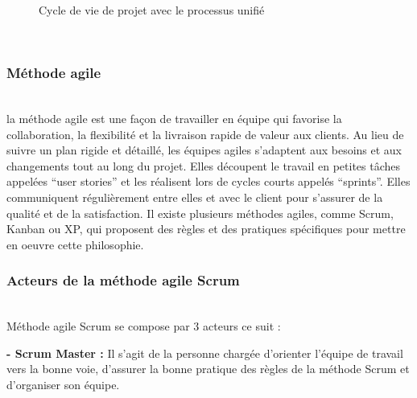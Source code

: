 \begin{figure}[H]
    \begin{center}
    \end{center}
    \caption{Cycle de vie de projet avec le processus unifié }
\end{figure}
\texttt{}\\[0.2cm]
\subsubsection{\Large Méthode agile }
\texttt{}\\[0.1cm]
\textsf{\selectfont{} la méthode agile est une façon de travailler en équipe qui favorise la collaboration, la flexibilité et la livraison rapide de valeur aux clients. Au lieu de suivre un plan rigide et détaillé, les équipes agiles s’adaptent aux besoins et aux changements tout au long du projet. Elles découpent le travail en petites tâches appelées “user stories” et les réalisent lors de cycles courts appelés “sprints”. Elles communiquent régulièrement entre elles et avec le client pour s’assurer de la qualité et de la satisfaction. Il existe plusieurs méthodes agiles, comme Scrum, Kanban ou XP, qui proposent des règles et des pratiques spécifiques pour mettre en oeuvre cette philosophie.
}\\[0.2cm]


\subsubsection{\Large    Acteurs de la méthode agile Scrum}
\texttt{}\\[0.1cm]
\textsf{\selectfont{}
Méthode agile Scrum se compose par 3  acteurs ce suit : }\\[0.1cm]
\par \noindent \textbf{\LARGE - Scrum Master : }\textsf{\selectfont{} Il s'agit de la personne chargée d'orienter l'équipe de travail vers la bonne voie, d'assurer la bonne pratique des règles de la méthode Scrum et d'organiser son équipe.} \\[0.1cm]

